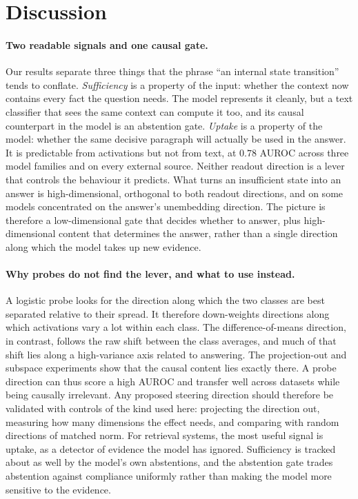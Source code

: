 \section{Discussion}
\label{sec:discussion}

\paragraph{Two readable signals and one causal gate.}
Our results separate three things that the phrase ``an internal state transition'' tends to conflate. \emph{Sufficiency} is a property of the input: whether the context now contains every fact the question needs. The model represents it cleanly, but a text classifier that sees the same context can compute it too, and its causal counterpart in the model is an abstention gate. \emph{Uptake} is a property of the model: whether the same decisive paragraph will actually be used in the answer. It is predictable from activations but not from text, at $0.78$ AUROC across three model families and on every external source. Neither readout direction is a lever that controls the behaviour it predicts. What turns an insufficient state into an answer is high-dimensional, orthogonal to both readout directions, and on some models concentrated on the answer's unembedding direction. The picture is therefore a low-dimensional gate that decides whether to answer, plus high-dimensional content that determines the answer, rather than a single direction along which the model takes up new evidence.

\paragraph{Why probes do not find the lever, and what to use instead.}
A logistic probe looks for the direction along which the two classes are best separated relative to their spread. It therefore down-weights directions along which activations vary a lot within each class. The difference-of-means direction, in contrast, follows the raw shift between the class averages, and much of that shift lies along a high-variance axis related to answering. The projection-out and subspace experiments show that the causal content lies exactly there. A probe direction can thus score a high AUROC and transfer well across datasets while being causally irrelevant. Any proposed steering direction should therefore be validated with controls of the kind used here: projecting the direction out, measuring how many dimensions the effect needs, and comparing with random directions of matched norm. For retrieval systems, the most useful signal is uptake, as a detector of evidence the model has ignored. Sufficiency is tracked about as well by the model's own abstentions, and the abstention gate trades abstention against compliance uniformly rather than making the model more sensitive to the evidence.
